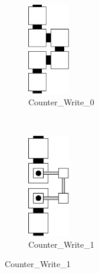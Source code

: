 \vspace{.5cm}

\begin{figure}[H]
    \centering
    \begin{subfigure}[t]{0.2\textwidth}
        \centering
        \includegraphics[width=0.2\textwidth]{write/write_0}
        \caption{\label{fig:write/write_1} Counter\_Write\_0}
    \end{subfigure}%
    ~
    \begin{subfigure}[t]{0.2\textwidth}
        \centering
        \includegraphics[width=0.2\textwidth]{write/write_1}
        \caption{\label{fig:write/write_1} Counter\_Write\_1}
    \end{subfigure}%
\end{figure}